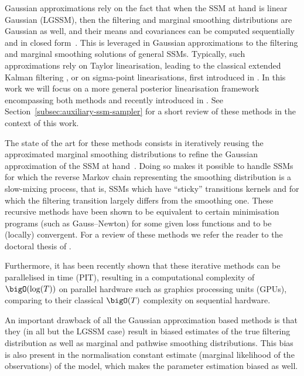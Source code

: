 Gaussian approximations rely on the fact that when the SSM at hand is linear Gaussian (LGSSM), then the filtering and marginal smoothing distributions are Gaussian as well, and their means and covariances can be computed sequentially and in closed form~\citep[see, e.g.,][]{sarkka2013bayesian,barfoot2017state}. This is leveraged in Gaussian approximations to the filtering and marginal smoothing solutions of general SSMs. Typically, such approximations rely on Taylor linearisation, leading to the classical extended Kalman filtering \citep[see, e.g.,][]{Jazwinski:1970}, or on sigma-point linearisations, first introduced in \citet{julier2004unscented,wan2000unscented}. In this work we will focus on a more general posterior linearisation framework encompassing both methods and recently introduced in \citet[][]{Garcia:2017,Tronarp2018iterative}. See Section~\ref{subsec:auxiliary-ssm-sampler} for a short review of these methods in the context of this work.

The state of the art for these methods consists in iteratively reusing the approximated marginal smoothing distributions to refine the Gaussian approximation of the SSM at hand~\citep{bell1994iterated,Garcia:2017,Tronarp2018iterative}. Doing so makes it possible to handle SSMs for which the reverse Markov chain representing the smoothing distribution is a slow-mixing process, that is, SSMs which have ``sticky'' transitions kernels and for which the filtering transition largely differs from the smoothing one. These recursive methods have been shown to be equivalent to certain minimisation programs (such as Gauss--Newton) for some given loss functions and to be (locally) convergent. For a review of these methods we refer the reader to the doctoral thesis of \citet{tronarp2020iterative}.

Furthermore, it has been recently shown \citep{Sarkka2021temporal,yaghoobi2021parallel,Yaghoobi2022sqrt} that these iterative methods can be parallelised in time (PIT), resulting in a computational complexity of $\bigO(\log(T))$ on parallel hardware such as graphics processing units (GPUs), comparing to their classical $\bigO(T)$ complexity on sequential hardware.

An important drawback of all the Gaussian approximation based methods is that they (in all but the LGSSM case) result in biased estimates of the true filtering distribution as well as marginal and pathwise smoothing distributions. This bias is also present in the normalisation constant estimate (marginal likelihood of the observations) of the model, which makes the parameter estimation biased as well. 
